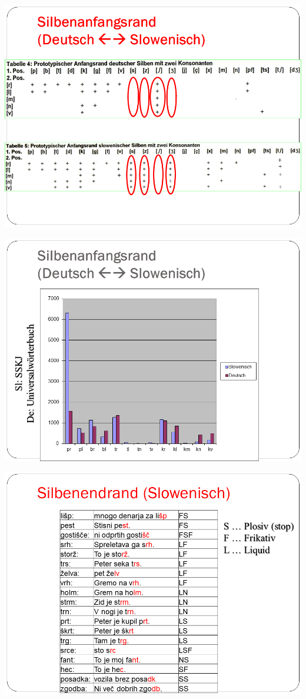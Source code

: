 \documentclass[
  letterpaper,
]{scrbook}
\begin{document}
\includegraphics[width=1\textwidth,height=\textheight]{./pictures/Wagner_Maas_Duden_Petric_48.PNG}

\includegraphics[width=1\textwidth,height=\textheight]{./pictures/Wagner_Maas_Duden_Petric_49.PNG}

\includegraphics[width=1\textwidth,height=\textheight]{./pictures/Wagner_Maas_Duden_Petric_50.PNG}
\end{document}
